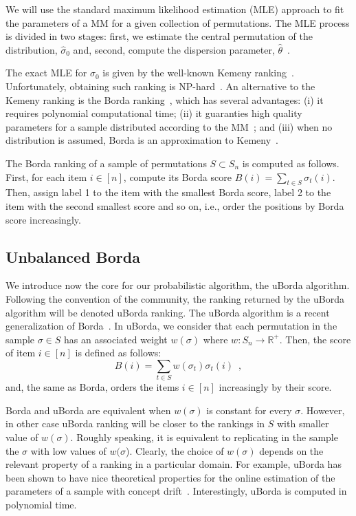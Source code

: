 \documentclass[runningheads]{llncs}
\begin{document}
We will use the standard maximum likelihood estimation (MLE) approach to fit the parameters of a MM for a given collection of permutations. 
The MLE process is divided in two stages: first, we estimate the central permutation of the distribution, $\hat{\sigma}_0$ and, second, compute the dispersion parameter, $\hat\theta$~\cite{IruCalLoz2016permallows}. 

The exact MLE for $\sigma_0$ is given by the well-known Kemeny ranking~\cite{DwoKumNao2001rank}. Unfortunately,  obtaining such ranking is NP-hard~\cite{DwoKumNao2001rank}. An alternative to the Kemeny ranking is the Borda ranking~\cite{AliMei2011kemeny}, which has several advantages: (i) it requires polynomial computational time; (ii) it  guaranties  high quality parameters for a sample distributed according to the MM~\cite{CarProSha2013votes}; and (iii) when no distribution is assumed, Borda is an approximation to Kemeny~\cite{CopFleRur2010ordering}.

The Borda ranking of a sample of permutations $S \subset S_n$ is computed as follows. 
First, for each item $i \in [n]$, compute its Borda score $B(i) =  \sum_{t\in S}  \sigma_t(i)$. Then, assign label 1 to the item with the smallest Borda score, label 2 to the item with the second smallest score and so on, i.e., order the positions by Borda score increasingly.

\subsection{Unbalanced Borda}\label{sec:uborda}
We introduce now the core for our probabilistic algorithm, the uBorda algorithm. Following the convention of the community, the ranking returned by the uBorda algorithm will be denoted uBorda ranking. The uBorda algorithm is a recent generalization of Borda~\cite{IruLobPer2020arxiv}. In uBorda, we consider that each permutation in the sample $\sigma\in S$ has an associated weight $w(\sigma)$ where $w\colon S_n \to \mathbb{R^{+}}$. Then, the score of item $i \in [n]$ is defined as follows:
%
\begin{equation}\label{eq:uborda_score}
B(i) =  \sum_{t\in S}  w(\sigma_t) \sigma_t(i) \enspace,
\end{equation}
%
and, the same as Borda, orders the items $i \in [n]$ increasingly by their score.

Borda and uBorda are equivalent when $w(\sigma)$ is constant for every $\sigma$. However, in other case uBorda ranking will be closer to the rankings in $S$ with smaller value of $w(\sigma)$. Roughly speaking, it is equivalent to replicating in the sample the $\sigma$ with low values of $w(\sigma$).
Clearly, the choice of  $w(\sigma)$ depends on the relevant property of a ranking in a particular domain. For example, uBorda has been shown to have nice theoretical properties for the online estimation of the parameters of a sample with concept drift~\cite{IruLobPer2020arxiv}.
%
Interestingly, uBorda is computed in polynomial time.
\end{document}
